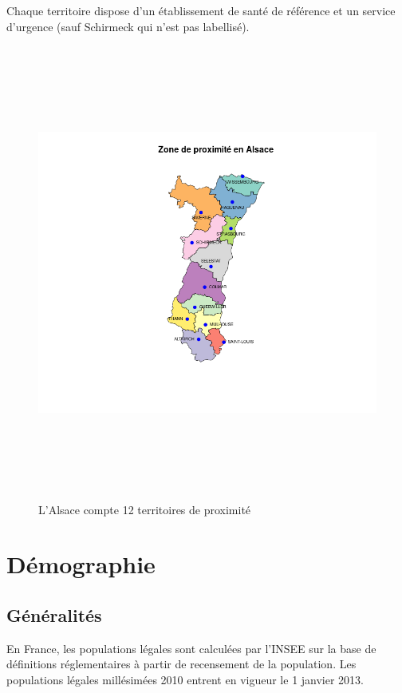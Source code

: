 \documentclass[12pt,english,french,twoside]{book}\usepackage[]{graphicx}\usepackage[]{color}
\begin{document}
Chaque territoire dispose d'un établissement de santé de référence et un service d'urgence (sauf Schirmeck qui n'est pas labellisé).

\begin{figure}[ht]
 \centering
 \includegraphics[height=15cm,keepaspectratio=true]{../doc/cartographie/RPU2013_Carto_Pop/figure/zp_avec_villes.png}
 \caption{L’Alsace compte 12 territoires de proximité}
 \label{fig:zp}
\end{figure}

\section{Démographie}
\subsection{Généralités}

En France, les populations légales sont calculées par l'INSEE sur la base de définitions réglementaires à partir de recensement de la population. 
Les populations légales millésimées 2010 entrent en vigueur le 1\ier{} janvier 2013.  
\end{document}
